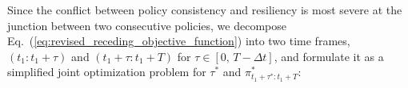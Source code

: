 \documentclass[letterpaper]{article} %
\newcommand{\argmax}{\mathop{\mathrm{argmax}}}
\begin{document}
Since the conflict between policy consistency and resiliency is most severe
at the junction between two consecutive policies,
we decompose Eq.~(\ref{eq:revised_receding_objective_function}) into two time frames, $(t_1:t_1+\tau)$ and $(t_1+\tau:t_1+T)$ for $\tau \in [0,\, T-\Delta t]$, and formulate it as a simplified joint optimization problem for $\tau^*$ and $\pi_{t_1+\tau^*:t_1+T}^*$:
%
%
%
%
%
\end{document}
